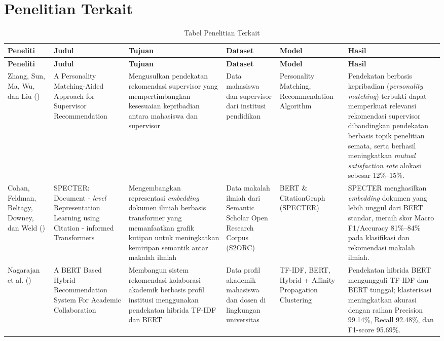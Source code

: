 \section{Penelitian Terkait}\label{penelitian-terkait}

\begingroup
\small 
\begin{longtable}[c]{|p{1.5cm}|p{2.2cm}|p{2.5cm}|p{1.8cm}|p{2cm}|p{3.2cm}|}

\caption{Tabel Penelitian Terkait} \label{table:tab2.1} \\
\hline
\textbf{Peneliti} & \textbf{Judul} & \textbf{Tujuan} & \textbf{Dataset} & \textbf{Model} & \textbf{Hasil} \\ \hline
\endfirsthead

\hline
\textbf{Peneliti} & \textbf{Judul} & \textbf{Tujuan} & \textbf{Dataset} & \textbf{Model} & \textbf{Hasil} \\ \hline
\endhead

\hline
\endlastfoot


Zhang, Sun, Ma, Wu, dan Liu (\citeyear{zhang2016supervisor}) & A Personality Matching-Aided Approach for Supervisor Recommendation & Mengusulkan pendekatan rekomendasi supervisor yang mempertimbangkan kesesuaian kepribadian antara mahasiswa dan supervisor & Data mahasiswa dan supervisor dari institusi pendidikan & Personality Matching, Recommendation Algorithm & Pendekatan berbasis kepribadian (\textit{personality matching}) terbukti dapat memperkuat relevansi rekomendasi supervisor dibandingkan pendekatan berbasis topik penelitian semata, serta berhasil meningkatkan \textit{mutual satisfaction rate} alokasi sebesar 12\%–15\%.  \\ \hline

Cohan, Feldman, Beltagy, Downey, dan Weld (\citeyear{cohan2020specter}) & SPECTER: Document - \textit{level} Representation Learning using Citation - informed Transformers & Mengembangkan representasi \textit{embedding} dokumen ilmiah berbasis transformer yang memanfaatkan grafik kutipan untuk meningkatkan kemiripan semantik antar makalah ilmiah & Data makalah ilmiah dari Semantic Scholar Open Research Corpus (S2ORC)& BERT \& CitationGraph (SPECTER) & SPECTER menghasilkan \textit{embedding} dokumen yang lebih unggul dari BERT standar, meraih skor Macro F1/Accuracy 81\%–84\% pada klasifikasi dan rekomendasi makalah ilmiah. \\ \hline

Nagarajan et al. (\citeyear{nagarajan2025bert}) & A BERT Based Hybrid Recommendation System For Academic Collaboration & Membangun sistem rekomendasi kolaborasi akademik berbasis profil institusi menggunakan pendekatan hibrida TF-IDF dan BERT & Data profil akademik mahasiswa dan dosen di lingkungan universitas & TF-IDF, BERT, Hybrid + Affinity Propagation Clustering & Pendekatan hibrida BERT mengungguli TF-IDF dan BERT tunggal; klasterisasi meningkatkan akurasi dengan raihan Precision 99.14\%, Recall 92.48\%, dan F1-score 95.69\%. \\ \hline


\end{longtable}
